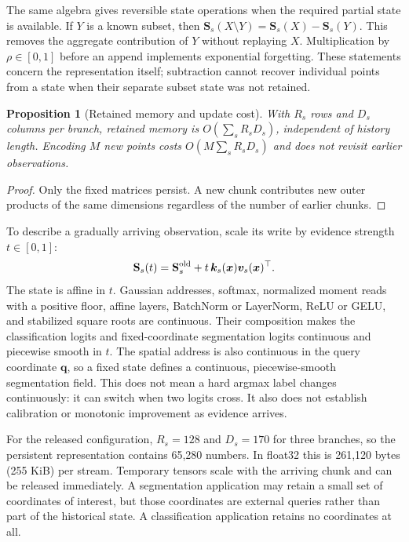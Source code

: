 \documentclass[11pt,a4paper]{article}
\newtheorem{proposition}{Proposition}
\newcommand{\Sstate}{\mathbf{S}}
\begin{document}
The same algebra gives reversible state operations when the required partial state is available. If $Y$ is a known subset, then $\Sstate_s(X\setminus Y)=\Sstate_s(X)-\Sstate_s(Y)$. This removes the aggregate contribution of $Y$ without replaying $X$. Multiplication by $\rho\in[0,1]$ before an append implements exponential forgetting. These statements concern the representation itself; subtraction cannot recover individual points from a state when their separate subset state was not retained.

\begin{proposition}[Retained memory and update cost]
\label{prop:memory}
With $R_s$ rows and $D_s$ columns per branch, retained memory is $O(\sum_sR_sD_s)$, independent of history length. Encoding $M$ new points costs $O(M\sum_sR_sD_s)$ and does not revisit earlier observations.
\end{proposition}
\begin{proof}
Only the fixed matrices persist. A new chunk contributes new outer products of the same dimensions regardless of the number of earlier chunks.
\end{proof}

To describe a gradually arriving observation, scale its write by evidence strength $t\in[0,1]$:
\begin{equation}
\Sstate_s(t)=\Sstate_s^{\rm old}+t\,\bm k_s(\bm x)\bm v_s(\bm x)^\top .
\label{eq:continuous-main}
\end{equation}
The state is affine in $t$. Gaussian addresses, softmax, normalized moment reads with a positive floor, affine layers, BatchNorm or LayerNorm, ReLU or GELU, and stabilized square roots are continuous. Their composition makes the classification logits and fixed-coordinate segmentation logits continuous and piecewise smooth in $t$. The spatial address is also continuous in the query coordinate $\bm q$, so a fixed state defines a continuous, piecewise-smooth segmentation field. This does not mean a hard argmax label changes continuously: it can switch when two logits cross. It also does not establish calibration or monotonic improvement as evidence arrives.

For the released configuration, $R_s=128$ and $D_s=170$ for three branches, so the persistent representation contains 65,280 numbers. In float32 this is 261,120 bytes (255 KiB) per stream. Temporary tensors scale with the arriving chunk and can be released immediately. A segmentation application may retain a small set of coordinates of interest, but those coordinates are external queries rather than part of the historical state. A classification application retains no coordinates at all.
\end{document}
